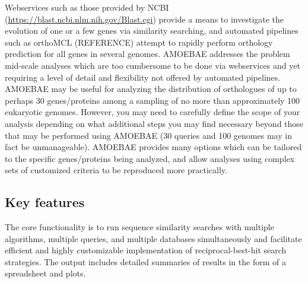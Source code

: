 \documentclass[12pt,letterpaper]{article}
\begin{document}
\begin{linenumbers}
    Webservices such as those provided by NCBI
    (\url{https://blast.ncbi.nlm.nih.gov/Blast.cgi}) provide a means to
    investigate the evolution of one or a few genes via similarity searching,
    and automated pipelines such as orthoMCL (REFERENCE) attempt to rapidly
    perform orthology prediction for all genes in several genomes. AMOEBAE
    addresses the problem mid-scale analyses which are too cumbersome to be
    done via webservices and yet requiring a level of detail and flexibility
    not offered by automated pipelines. AMOEBAE may be useful for analyzing the
    distribution of orthologues of up to perhaps 30 genes/proteins among a
    sampling of no more than approximately 100 eukaryotic genomes.  However,
    you may need to carefully define the scope of your analysis depending on
    what additional steps you may find necessary beyond those that may be
    performed using AMOEBAE (30 queries and 100 genomes may in fact be
    unmanageable). AMOEBAE provides many options which can be tailored to the
    specific genes/proteins being analyzed, and allow analyses using complex
    sets of customized criteria to be reproduced more practically. 



\subsection{Key features}

The core functionality is to run sequence similarity searches with multiple
    algorithms, multiple queries, and multiple databases simultaneously and
    facilitate efficient and highly customizable implementation of
    reciprocal-best-hit search strategies. The output includes detailed
    summaries of results in the form of a spreadsheet and plots.


\end{linenumbers}
\end{document}
